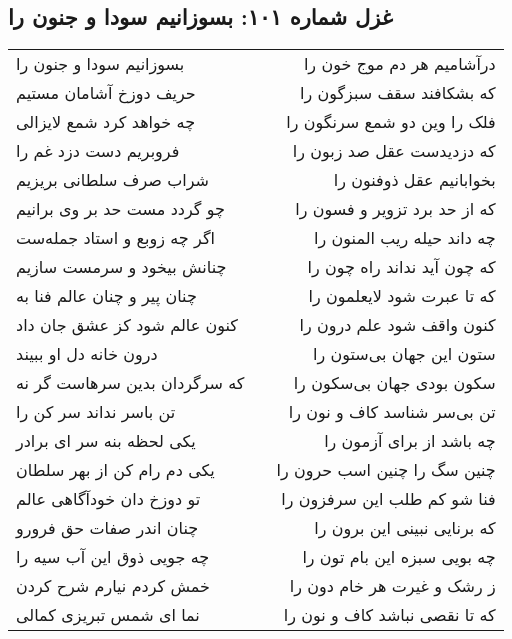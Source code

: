 \begin{center}
\section*{غزل شماره ۱۰۱: بسوزانیم سودا و جنون را}
\label{sec:0101}
\begin{longtable}{l p{0.5cm} r}
بسوزانیم سودا و جنون را
&&
درآشامیم هر دم موج خون را
\\
حریف دوزخ آشامان مستیم
&&
که بشکافند سقف سبزگون را
\\
چه خواهد کرد شمع لایزالی
&&
فلک را وین دو شمع سرنگون را
\\
فروبریم دست دزد غم را
&&
که دزدیدست عقل صد زبون را
\\
شراب صرف سلطانی بریزیم
&&
بخوابانیم عقل ذوفنون را
\\
چو گردد مست حد بر وی برانیم
&&
که از حد برد تزویر و فسون را
\\
اگر چه زوبع و استاد جمله‌ست
&&
چه داند حیله ریب المنون را
\\
چنانش بیخود و سرمست سازیم
&&
که چون آید نداند راه چون را
\\
چنان پیر و چنان عالم فنا به
&&
که تا عبرت شود لایعلمون را
\\
کنون عالم شود کز عشق جان داد
&&
کنون واقف شود علم درون را
\\
درون خانه دل او ببیند
&&
ستون این جهان بی‌ستون را
\\
که سرگردان بدین سرهاست گر نه
&&
سکون بودی جهان بی‌سکون را
\\
تن باسر نداند سر کن را
&&
تن بی‌سر شناسد کاف و نون را
\\
یکی لحظه بنه سر ای برادر
&&
چه باشد از برای آزمون را
\\
یکی دم رام کن از بهر سلطان
&&
چنین سگ را چنین اسب حرون را
\\
تو دوزخ دان خودآگاهی عالم
&&
فنا شو کم طلب این سرفزون را
\\
چنان اندر صفات حق فرورو
&&
که برنایی نبینی این برون را
\\
چه جویی ذوق این آب سیه را
&&
چه بویی سبزه این بام تون را
\\
خمش کردم نیارم شرح کردن
&&
ز رشک و غیرت هر خام دون را
\\
نما ای شمس تبریزی کمالی
&&
که تا نقصی نباشد کاف و نون را
\\
\end{longtable}
\end{center}
